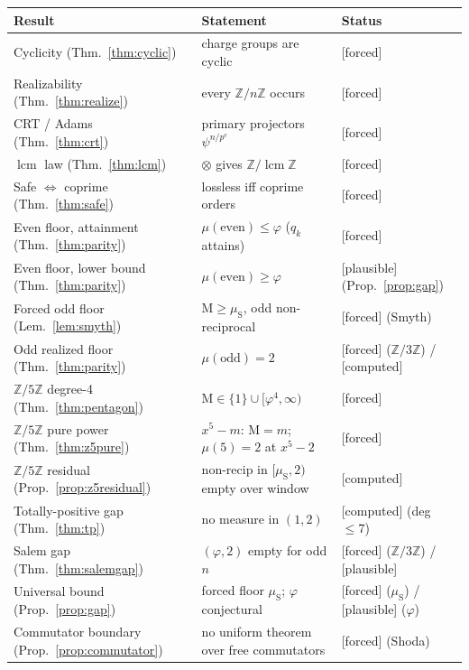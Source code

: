 \documentclass[11pt]{article}
\theoremstyle{definition}
\theoremstyle{remark}
\newcommand{\Mah}{\mathrm{M}}
\newcommand{\Z}{\mathbb{Z}}
\newcommand{\Adams}[1]{\psi^{#1}}
\newcommand{\gold}{\varphi}
\newcommand{\tens}{\otimes}
\newcommand{\Zmod}[1]{\Z/#1\Z}
\newcommand{\status}[1]{{\small\textsf{[#1]}}}
\newcommand{\forced}{\status{forced}}
\newcommand{\computed}{\status{computed}}
\newcommand{\plausible}{\status{plausible}}
\newcommand{\muS}{\mu_{\mathrm{S}}}
\begin{document}
\begin{center}
\begin{tabular}{lll}
\toprule
Result & Statement & Status \\
\midrule
Cyclicity (Thm.~\ref{thm:cyclic}) & charge groups are cyclic & \forced{} \\
Realizability (Thm.~\ref{thm:realize}) & every $\Zmod n$ occurs & \forced{} \\
CRT / Adams (Thm.~\ref{thm:crt}) & primary projectors $\Adams{n/p^{e}}$ & \forced{} \\
$\operatorname{lcm}$ law (Thm.~\ref{thm:lcm}) & $\tens$ gives $\Zmod{\operatorname{lcm}}$ & \forced{} \\
Safe $\Leftrightarrow$ coprime (Thm.~\ref{thm:safe}) & lossless iff coprime orders & \forced{} \\
Even floor, attainment (Thm.~\ref{thm:parity}) & $\mu(\text{even})\le\gold$ ($q_k$ attains) & \forced{} \\
Even floor, lower bound (Thm.~\ref{thm:parity}) & $\mu(\text{even})\ge\gold$ & \plausible{} (Prop.~\ref{prop:gap}) \\
Forced odd floor (Lem.~\ref{lem:smyth}) & $\Mah\ge\muS$, odd non-reciprocal & \forced{} (Smyth) \\
Odd realized floor (Thm.~\ref{thm:parity}) & $\mu(\text{odd})=2$ & \forced{} ($\Zmod3$) / \computed{} \\
$\Zmod5$ degree-4 (Thm.~\ref{thm:pentagon}) & $\Mah\in\{1\}\cup[\gold^{4},\infty)$ & \forced{} \\
$\Zmod5$ pure power (Thm.~\ref{thm:z5pure}) & $x^{5}-m$: $\Mah=m$; $\mu(5)=2$ at $x^{5}-2$ & \forced{} \\
$\Zmod5$ residual (Prop.~\ref{prop:z5residual}) & non-recip in $[\muS,2)$ empty over window & \computed{} \\
Totally-positive gap (Thm.~\ref{thm:tp}) & no measure in $(1,2)$ & \computed{} (deg $\le7$) \\
Salem gap (Thm.~\ref{thm:salemgap}) & $(\gold,2)$ empty for odd $n$ & \forced{} ($\Zmod3$) / \plausible{} \\
Universal bound (Prop.~\ref{prop:gap}) & forced floor $\muS$; $\gold$ conjectural & \forced{} ($\muS$) / \plausible{} ($\gold$) \\
Commutator boundary (Prop.~\ref{prop:commutator}) & no uniform theorem over free commutators & \forced{} (Shoda) \\
\bottomrule
\end{tabular}
\end{center}
\end{document}
